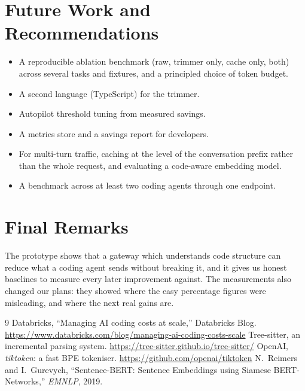 \documentclass[12pt, a4paper, oneside]{report}
\begin{document}
\section{Future Work and Recommendations}

\begin{itemize}
    \item A reproducible ablation benchmark (raw, trimmer only, cache only, both)
          across several tasks and fixtures, and a principled choice of token
          budget.
    \item A second language (TypeScript) for the trimmer.
    \item Autopilot threshold tuning from measured savings.
    \item A metrics store and a savings report for developers.
    \item For multi-turn traffic, caching at the level of the conversation prefix
          rather than the whole request, and evaluating a code-aware embedding model.
    \item A benchmark across at least two coding agents through one endpoint.
\end{itemize}

\section{Final Remarks}

The prototype shows that a gateway which understands code structure can reduce what
a coding agent sends without breaking it, and it gives us honest baselines to
measure every later improvement against. The measurements also changed our plans:
they showed where the easy percentage figures were misleading, and where the next
real gains are.

\begin{thebibliography}{9}
 Databricks, ``Managing AI coding costs at scale,'' Databricks
    Blog. \url{https://www.databricks.com/blog/managing-ai-coding-costs-scale}
 Tree-sitter, an incremental parsing system.
    \url{https://tree-sitter.github.io/tree-sitter/}
 OpenAI, \emph{tiktoken}: a fast BPE tokeniser.
    \url{https://github.com/openai/tiktoken}
 N.~Reimers and I.~Gurevych, ``Sentence-BERT: Sentence Embeddings
    using Siamese BERT-Networks,'' \emph{EMNLP}, 2019.
\end{thebibliography}
\end{document}
